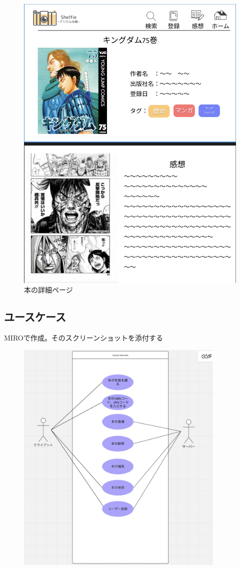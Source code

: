 \documentclass[a4paper, 11pt, titlepage]{jsarticle}
\begin{document}
\begin{figure}[htbp]
\centering
\includegraphics[width=120mm]{detailpage.png}
\caption{本の詳細ページ}
\label{fig:func}
\end{figure}

\subsection{ユースケース}
MIROで作成。そのスクリーンショットを添付する
\begin{figure}[htbp]
\centering
\includegraphics[width=100mm]{usecase.png}
\label{fig:func}
\end{figure}
\end{document}

